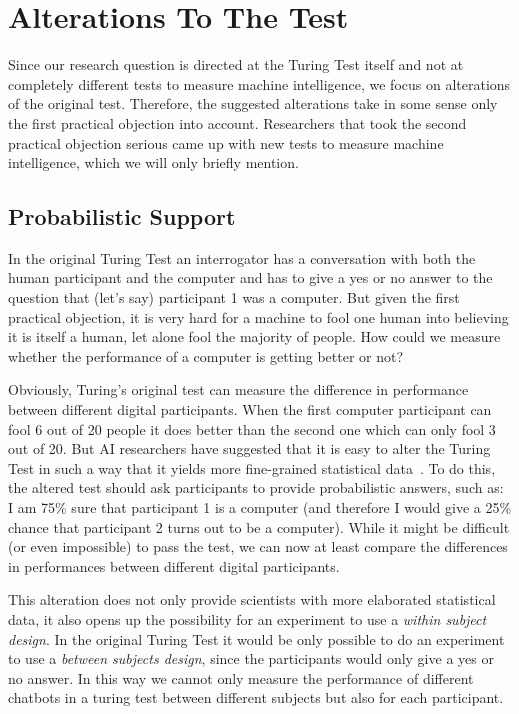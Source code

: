 \section{Alterations To The Test}
Since our research question is directed at the Turing Test itself and not at completely different tests to measure machine intelligence, we focus on alterations of the original test. Therefore, the suggested alterations take in some sense only the first practical objection into account. Researchers that took the second practical objection serious came up with new tests to measure machine intelligence, which we will only briefly mention.

\subsection{Probabilistic Support}
In the original Turing Test an interrogator has a conversation with both the human participant and the computer and has to give a yes or no answer to the question that (let's say) participant 1 was a computer. But given the first practical objection, it is very hard for a machine to fool one human into believing it is itself a human, let alone fool the majority of people. How could we measure whether the performance of a computer is getting better or not?

Obviously, Turing's original test can measure the difference in performance between different digital participants. When the first computer participant can fool 6 out of 20 people it does better than the second one which can only fool 3 out of 20. But AI researchers have suggested that it is easy to alter the Turing Test in such a way that it yields more fine-grained statistical data~\cite{shieber2007turing}. To do this, the altered test should ask participants to provide probabilistic answers, such as: I am 75\% sure that participant 1 is a computer (and therefore I would give a 25\% chance that participant 2 turns out to be a computer). While it might be difficult (or even impossible) to pass the test, we can now at least compare the differences in performances between different digital participants.

This alteration does not only provide scientists with more elaborated statistical data, it also opens up the possibility for an experiment to use a \textit{within subject design}. In the original Turing Test it would be only possible to do an experiment to use a \textit{between subjects design}, since the participants would only give a yes or no answer. In this way we cannot only measure the performance of different chatbots in a turing test between different subjects but also for each participant.


